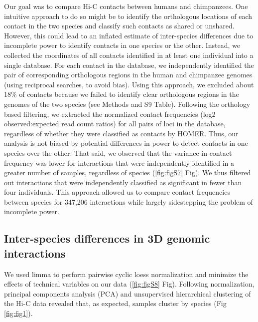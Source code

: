 Our goal was to compare Hi-C contacts between humans and chimpanzees. One intuitive approach to do so might be to identify the orthologous locations of each contact in the two species and classify such contacts as shared or unshared. However, this could lead to an inflated estimate of inter-species differences due to incomplete power to identify contacts in one species or the other. Instead, we collected the coordinates of all contacts identified in at least one individual into a single database. For each contact in the database, we independently identified the pair of corresponding orthologous regions in the human and chimpanzee genomes (using reciprocal searches, to avoid bias). Using this approach, we excluded about 18\% of contacts because we failed to identify clear orthologous regions in the genomes of the two species (see Methods and S9 Table). Following the orthology based filtering, we extracted the normalized contact frequencies (log2 observed:expected read count ratios) for all pairs of loci in the database, regardless of whether they were classified as contacts by HOMER. Thus, our analysis is not biased by potential differences in power to detect contacts in one species over the other. That said, we observed that the variance in contact frequency was lower for interactions that were independently identified in a greater number of samples, regardless of species (\ref{fig:figS7} Fig). We thus filtered out interactions that were independently classified as significant in fewer than four individuals. This approach allowed us to compare contact frequencies between species for 347,206 interactions while largely sidestepping the problem of incomplete power.

\subsection{Inter-species differences in 3D genomic interactions}
We used limma \cite{Smyth.2004} to perform pairwise cyclic loess normalization and minimize the effects of technical variables on our data (\ref{fig:figS8} Fig). Following normalization, principal components analysis (PCA) and unsupervised hierarchical clustering of the Hi-C data revealed that, as expected, samples cluster by species (Fig \ref{fig:fig1}).


